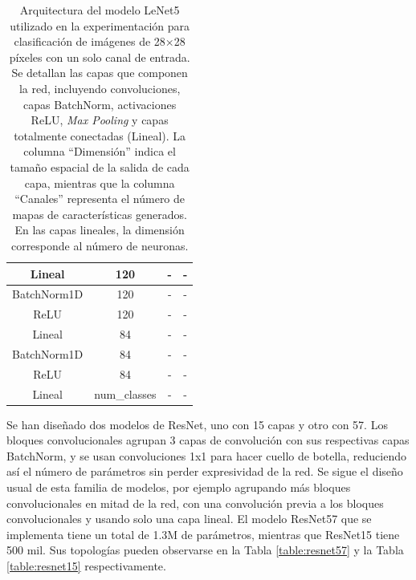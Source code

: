 \begin{table}[]
\begin{tabular}{|c|c|c|c|}
Lineal                         & 120                                 & -                                & -                                 \\ \hline
BatchNorm1D                    & 120                                 & -                                & -                                 \\ \hline
ReLU                           & 120                                 & -                                & -                                 \\ \hline
Lineal                         & 84                                  & -                                & -                                 \\ \hline
BatchNorm1D                    & 84                                  & -                                & -                                 \\ \hline
ReLU                           & 84                                  & -                                & -                                 \\ \hline
Lineal                         & num\_classes                        & -                                & -                                 \\ \hline
\end{tabular}
\caption[Arquitectura del modelo LeNet5 utilizado en la experimentación para clasificación de imágenes de 28×28 píxeles con un solo canal de entrada]{Arquitectura del modelo LeNet5 utilizado en la experimentación para clasificación de imágenes de 28×28 píxeles con un solo canal de entrada. Se detallan las capas que componen la red, incluyendo convoluciones, capas BatchNorm, activaciones ReLU, \textit{Max Pooling} y capas totalmente conectadas (Lineal). La columna ``Dimensión'' indica el tamaño espacial de la salida de cada capa, mientras que la columna ``Canales'' representa el número de mapas de características generados. En las capas lineales, la dimensión corresponde al número de neuronas.}
\label{table:lenet5}
\end{table}


Se han diseñado dos modelos de ResNet, uno con 15 capas y otro con 57. Los bloques convolucionales agrupan 3 capas de convolución con sus respectivas capas BatchNorm, y se usan convoluciones 1x1 para hacer cuello de botella, reduciendo así el número de parámetros sin perder expresividad de la red. Se sigue el diseño usual de esta familia de modelos, por ejemplo agrupando más bloques convolucionales en mitad de la red, con una convolución previa a los bloques convolucionales y usando solo una capa lineal. El modelo ResNet57 que se implementa tiene un total de 1.3M de parámetros, mientras que ResNet15 tiene 500 mil. Sus topologías pueden observarse en la Tabla \ref{table:resnet57} y la Tabla \ref{table:resnet15} respectivamente. 

